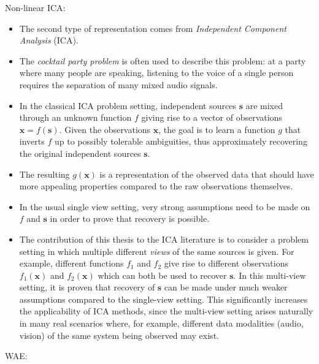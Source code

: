 Non-linear ICA:

\begin{itemize}
\item The second type of representation comes from \emph{Independent Component Analysis} (ICA). 
\item The \emph{cocktail party problem} is often used to describe this problem: at a party where many people are speaking, listening to the voice of a single person requires the separation of many mixed audio signals.
\item In the classical ICA problem setting, independent sources $\mathbf{s}$ are mixed through an unknown function $f$ giving rise to a vector of observations $\mathbf{x} = f(\mathbf{s})$. Given the observations $\mathbf{x}$, the goal is to learn a function $g$ that inverts $f$ up to possibly tolerable ambiguities, thus approximately recovering the original independent sources $\mathbf{s}$. 
\item The resulting $g(\mathbf{x})$ is a representation of the observed data that should have more appealing properties compared to the raw observations themselves.
\item In the usual single view setting, very strong assumptions need to be made on $f$ and $\mathbf{s}$ in order to prove that recovery is possible. 
\item The contribution of this thesis to the ICA literature is to consider a problem setting in which multiple different \emph{views} of the same sources is given. For example, different functions $f_1$ and $f_2$ give rise to different observations $f_1(\mathbf{x})$ and $f_2(\mathbf{x})$ which can both be used to recover $\mathbf{s}$. In this multi-view setting, it is proven that recovery of $\mathbf{s}$ can be made under much weaker assumptions compared to the single-view setting. This significantly increases the applicability of ICA methods, since the multi-view setting arises naturally in many real scenarios where, for example, different data modalities (audio, vision) of the same system being observed may exist.
\end{itemize}

WAE:

